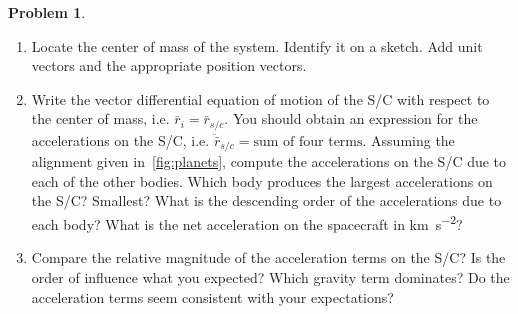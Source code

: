 \documentclass[10pt]{article}
\theoremstyle{definition}
\newtheorem{prob}{Problem}[section]
\newenvironment{subprob}%
{\renewcommand{\theenumi}{\alph{enumi}}\renewcommand{\labelenumi}{(\theenumi)}\begin{enumerate}}%
{\end{enumerate}}%
\begin{document}
\begin{prob}
    \begin{subprob}
    \item Locate the center of mass of the system. 
        Identify it on a sketch.
        Add unit vectors and the appropriate position vectors.
    \item Write the vector differential equation of motion of the S/C with respect to the center of mass, i.e. \( \bar r_i = \bar r_{s/c}\).
        You should obtain an expression for the accelerations on the S/C, i.e. \( \ddot \bar r_{s/c} = \text{sum of four terms} \).
        Assuming the alignment given in~\cref{fig:planets}, compute the accelerations on the S/C due to each of the other bodies.
        Which body produces the largest accelerations on the S/C?
        Smallest?
        What is the descending order of the accelerations due to each body?
        What is the net acceleration on the spacecraft in \si{\kilo\meter\per\second\squared}?
    \item Compare the relative magnitude of the acceleration terms on the S/C?
        Is the order of influence what you expected?
        Which gravity term dominates?
        Do the acceleration terms seem consistent with your expectations?
    \end{subprob}
\end{prob}
\end{document}
